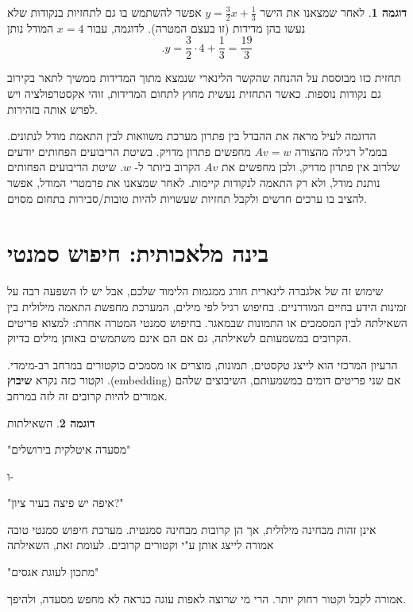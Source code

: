 \documentclass[12pt]{report}
\theoremstyle{plain}
\theoremstyle{definition}
\newtheorem{example}{דוגמה}[chapter]
\newcommand{\0}{\mathbf{0}}
\begin{document}
\begin{example}
לאחר שמצאנו את הישר
$y=\frac{3}{2}x+\frac{1}{3}$
אפשר להשתמש בו גם לתחזיות בנקודות שלא נעשו בהן מדידות (זו בעצם המטרה).
לדוגמה, עבור
$x=4$
המודל נותן
$$
.y=\frac{3}{2}\cdot 4+\frac{1}{3}=\frac{19}{3}
$$

תחזית כזו מבוססת על ההנחה שהקשר הלינארי שנמצא מתוך המדידות ממשיך לתאר בקירוב גם נקודות נוספות. כאשר התחזית נעשית מחוץ לתחום המדידות, זוהי אקסטרפולציה ויש לפרש אותה בזהירות.

\end{example}

הדוגמה לעיל מראה את ההבדל בין פתרון מערכת משוואות לבין התאמת מודל לנתונים.
בממ"ל רגילה מהצורה
$Av=w$
מחפשים פתרון מדויק.
בשיטת הריבועים הפחותים יודעים שלרוב אין פתרון מדויק, ולכן מחפשים את
$Av$
הקרוב ביותר ל-
$w$.
שיטת הריבועים הפחותים נותנת מודל, ולא רק התאמה לנקודות קיימות. לאחר שמצאנו את פרמטרי המודל, אפשר להציב בו ערכים חדשים ולקבל תחזיות שעשויות להיות טובות/סבירות בתחום מסוים.

\section{בינה מלאכותית: חיפוש סמנטי}

שימוש זה של אלגברה לינארית חורג ממגמות הלימוד שלכם, אבל יש לו השפעה רבה על זמינות הידע בחיים המודרניים. בחיפוש רגיל לפי מילים, המערכת מחפשת התאמה מילולית בין השאילתה לבין המסמכים או התמונות שבמאגר. בחיפוש סמנטי המטרה אחרת: למצוא פריטים הקרובים במשמעותם לשאילתה, גם אם הם אינם משתמשים באותן מילים בדיוק.

הרעיון המרכזי הוא לייצג טקסטים, תמונות, מוצרים או מסמכים כוקטורים במרחב רב-מימדי.
וקטור כזה נקרא
\textbf{שיבוץ}
.(embedding)
אם שני פריטים דומים במשמעותם, השיבוצים שלהם אמורים להיות קרובים זה לזה במרחב.

\begin{example}
השאילתות

\begin{center}
"מסעדה איטלקית בירושלים"
\end{center}

ו-

\begin{center}
"איפה יש פיצה בעיר ציון?"
\end{center}

אינן זהות מבחינה מילולית, אך הן קרובות מבחינה סמנטית. מערכת חיפוש סמנטי טובה אמורה לייצג אותן ע"י וקטורים קרובים. לעומת זאת, השאילתה

\begin{center}
"מתכון לעוגת אגסים"
\end{center}

אמורה לקבל וקטור רחוק יותר. הרי מי שרוצה לאפות עוגה כנראה לא מחפש מסעדה, ולהיפך.

\end{example}
\end{document}
